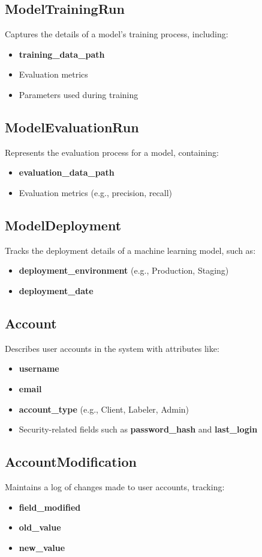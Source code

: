 \documentclass[12pt, titlepage]{article}
\begin{document}
\subsection*{ModelTrainingRun}
Captures the details of a model's training process, including:
\begin{itemize}
    \item \textbf{training\_data\_path}
    \item Evaluation metrics
    \item Parameters used during training
\end{itemize}

\subsection*{ModelEvaluationRun}
Represents the evaluation process for a model, containing:
\begin{itemize}
    \item \textbf{evaluation\_data\_path}
    \item Evaluation metrics (e.g., precision, recall)
\end{itemize}

\subsection*{ModelDeployment}
Tracks the deployment details of a machine learning model, such as:
\begin{itemize}
    \item \textbf{deployment\_environment} (e.g., Production, Staging)
    \item \textbf{deployment\_date}
\end{itemize}

\subsection*{Account}
Describes user accounts in the system with attributes like:
\begin{itemize}
    \item \textbf{username}
    \item \textbf{email}
    \item \textbf{account\_type} (e.g., Client, Labeler, Admin)
    \item Security-related fields such as \textbf{password\_hash} and \textbf{last\_login}
\end{itemize}

\subsection*{AccountModification}
Maintains a log of changes made to user accounts, tracking:
\begin{itemize}
    \item \textbf{field\_modified}
    \item \textbf{old\_value}
    \item \textbf{new\_value}
\end{itemize}
\end{document}
